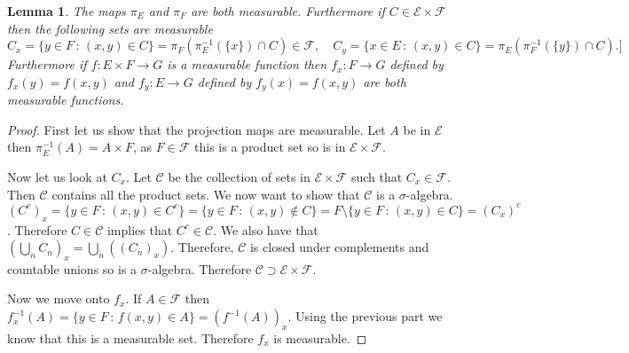 \documentclass[11pt]{article}
\newtheorem{lem}[thm]{Lemma}
\theoremstyle{definition}
\theoremstyle{remark}
\begin{document}
\begin{lem}
The maps $\pi_E$ and $\pi_F$ are both measurable. Furthermore if $C \in \mathcal{E} \times \mathcal{F}$ then the following sets are measurable
\[ C_x = \{ y \in F \,:\, (x,y) \in C \} = \pi_F\left(\pi_E^{-1}(\{x\}) \cap C\right) \in \mathcal{F} , \quad C_y = \{ x \in E \,:\, (x,y) \in C\} = \pi_E \left( \pi_F^{-1}(\{y\}) \cap C \right). ] \]
Furthermore if $f: E \times F \rightarrow G$ is a measurable function then $f_x: F \rightarrow G$ defined by $f_x(y) = f(x,y)$ and $f_y: E \rightarrow G$ defined by $f_y(x) = f(x,y)$ are both measurable functions. 
\end{lem}
\begin{proof}
First let us show that the projection maps are measurable. Let $A$ be in $\mathcal{E}$ then $\pi_E^{-1}(A) = A \times F$, as $F \in \mathcal{F}$ this is a product set so is in $\mathcal{E} \times \mathcal{F}$.

Now let us look at $C_x$. Let $\mathcal{C}$ be the collection of sets in $\mathcal{E} \times \mathcal{F}$ such that $C_x \in \mathcal{F}$. Then $\mathcal{C}$ contains all the product sets. We now want to show that $\mathcal{C}$ is a $\sigma$-algebra. $(C^c)_x = \{ y \in F \,:\, (x,y) \in C^c\} = \{ y \in F \, :\, (x,y) \notin C\}  = F \setminus \{ y \in F\,:\, (x,y) \in C\} = (C_x)^c$. Therefore $C \in \mathcal{C}$ implies that $C^c \in \mathcal{C}$. We also have that $\left(\bigcup_n C_n \right)_x = \bigcup_n \left( (C_n)_x \right)$. Therefore, $\mathcal{C}$ is closed under complements and countable unions so is a $\sigma$-algebra. Therefore $\mathcal{C} \supset \mathcal{E} \times \mathcal{F}$.

Now we move onto $f_x$. If $A \in \mathcal{F}$ then $f_x^{-1}(A) = \{ y \in F \,:\, f(x,y) \in A\} = (f^{-1}(A))_x$. Using the previous part we know that this is a measurable set. Therefore $f_x$ is measurable.
\end{proof}
\end{document}
